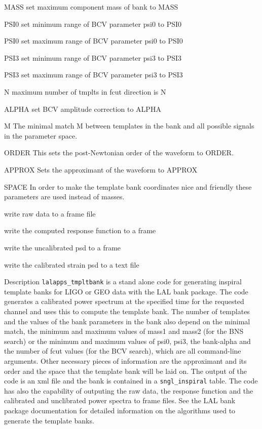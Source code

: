 \begin{entry}
\item[\option{--maximum-mass} \textsc{MASS}] set maximum component mass of bank to MASS
\item[\option{--minimum-psi0} \textsc{ PSI0}] set minimum range of BCV parameter psi0 to PSI0
\item[\option{--maximum-psi0} \textsc{ PSI0}] set maximum range of BCV parameter psi0 to PSI0
\item[\option{--minimum-psi3} \textsc{ PSI3}] set minimum range of BCV parameter psi3 to PSI3
\item[\option{--maximum-psi3} \textsc{ PSI3}] set maximum range of BCV parameter psi3 to PSI3
\item[\option{-maximum-fcut-tmplts} \textsc{ N}] maximum number of tmplts in fcut direction is N
\item[\option{--alpha} \textsc{ ALPHA}] set BCV amplitude correction to ALPHA
\item[\option{--minimal-match} \textsc{ M}] The minimal match M between templates in the 
bank and all possible signals in the parameter space. 
\item[\option{--order} \textsc{ ORDER}] This sets the post-Newtonian order of the waveform to
ORDER.   
\item[\option{--approximant} \textsc{ APPROX}] Sets the approximant of the waveform to APPROX
\item[\option{--space} \textsc{ SPACE}] In order to make the template bank coordinates nice
and friendly these parameters are used instead of masses.  
\item[\option{--write-raw-data}] write raw data to a frame file
\item[\option{--write-response}] write the computed response function to a frame
\item[\option{--write-spectrum}] write the uncalibrated psd to a frame
\item[\option{--write-strain-spectrum}] write the calibrated strain psd to a text file

\item[Description]
\noindent \verb$lalapps_tmpltbank$ is a stand alone code for generating inspiral
template banks for LIGO or GEO data with the LAL bank package.  The code 
generates a calibrated power spectrum at the specified time for the 
requested channel and uses this to compute the template bank.  
The number of templates and the
values of the bank parameters in the bank also depend on the minimal
match, the
minimum and maximum values of mass1 and mass2 (for the BNS search) or the
minimum and maximum values of psi0, psi3, the bank-alpha and the number of
fcut values (for the BCV search), which are all command-line arguments.
Other necessary pieces of information are the approximant and its order and
the space that the template bank will be laid on. The output of the code is
an xml file and the bank is contained in a \verb$sngl_inspiral$ table. The code has
also the capability of outputing the raw data, the response function and the
calibrated and unclibrated power spectra to frame files.
See the LAL bank package
documentation for detailed information on the algorithms used to generate the
template banks.


\end{entry}
